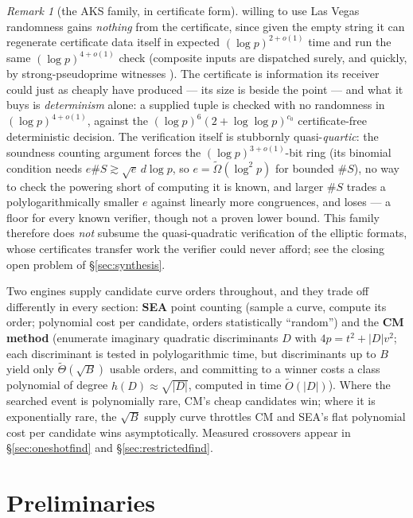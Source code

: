 \documentclass[11pt]{amsart}
\newcommand{\Ot}{\widetilde{O}}
\newcommand{\Tt}{\widetilde{\Theta}}
\theoremstyle{plain}
\theoremstyle{definition}
\theoremstyle{remark}
\newtheorem{remark}[theorem]{Remark}
\begin{document}
\begin{remark}[the AKS family, in certificate form]
willing to use Las Vegas randomness gains \emph{nothing} from the certificate, since given the empty
string it can regenerate certificate data itself in expected $(\log p)^{2+o(1)}$ time and run the
same $(\log p)^{4+o(1)}$ check (composite inputs are dispatched surely, and quickly, by
strong-pseudoprime witnesses \cite{Mil76,Rab80}).  The certificate is information its receiver could
just as cheaply have produced --- its size is beside the point --- and what it buys is
\emph{determinism} alone: a supplied tuple is checked with no randomness in $(\log p)^{4+o(1)}$,
against the $(\log p)^{6}(2+\log\log p)^{c_0}$ certificate-free deterministic decision.  The
verification itself is stubbornly quasi-\emph{quartic}: the soundness counting argument forces the
$(\log p)^{3+o(1)}$-bit ring (its binomial condition needs $e\#S \gtrsim \sqrt{e}\,d\log p$, so
$e = \widetilde\Omega(\log^2 p)$ for bounded $\#S$), no way to check the powering short of computing
it is known, and larger $\#S$ trades a polylogarithmically smaller $e$ against linearly more
congruences, and loses --- a floor for every known verifier, though not a proven lower bound.  This
family therefore does \emph{not} subsume the quasi-quadratic verification of the elliptic formats,
whose certificates transfer work the verifier could never afford; see the closing open problem of
\S\ref{sec:synthesis}.
\end{remark}

Two engines supply candidate curve orders throughout, and they trade off differently in every section:
\textbf{SEA} point counting (sample a curve, compute its order; polynomial cost per candidate, orders
statistically ``random'') and the \textbf{CM method} (enumerate imaginary quadratic discriminants $D$
with $4p = t^2 + |D|v^2$; each discriminant is tested in polylogarithmic time, but discriminants up to
$B$ yield only $\Tt(\sqrt B)$ usable orders, and committing to a winner costs a class polynomial
of degree $h(D) \approx \sqrt{|D|}$, computed in time $\Ot(|D|)$).  Where the searched event is polynomially rare, CM's cheap
candidates win; where it is exponentially rare, the $\sqrt B$ supply curve throttles CM and SEA's flat
polynomial cost per candidate wins asymptotically.  Measured crossovers appear in \S\ref{sec:oneshotfind}
and \S\ref{sec:restrictedfind}.

\section{Preliminaries}\label{sec:prelim}
\end{document}
